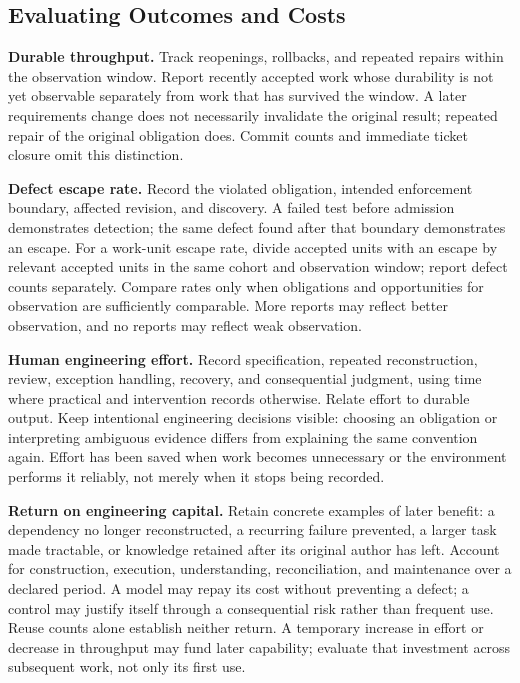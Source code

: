 \subsection{Evaluating Outcomes and Costs}\label{heading:evaluating-outcomes-and-costs}

\textbf{Durable throughput.} Track reopenings, rollbacks, and repeated repairs within the observation window. Report recently accepted work whose durability is not yet observable separately from work that has survived the window. A later requirements change does not necessarily invalidate the original result; repeated repair of the original obligation does. Commit counts and immediate ticket closure omit this distinction.

\textbf{Defect escape rate.} Record the violated obligation, intended enforcement boundary, affected revision, and discovery. A failed test before admission demonstrates detection; the same defect found after that boundary demonstrates an escape. For a work-unit escape rate, divide accepted units with an escape by relevant accepted units in the same cohort and observation window; report defect counts separately. Compare rates only when obligations and opportunities for observation are sufficiently comparable. More reports may reflect better observation, and no reports may reflect weak observation.

\textbf{Human engineering effort.} Record specification, repeated reconstruction, review, exception handling, recovery, and consequential judgment, using time where practical and intervention records otherwise. Relate effort to durable output. Keep intentional engineering decisions visible: choosing an obligation or interpreting ambiguous evidence differs from explaining the same convention again. Effort has been saved when work becomes unnecessary or the environment performs it reliably, not merely when it stops being recorded.

\textbf{Return on engineering capital.} Retain concrete examples of later benefit: a dependency no longer reconstructed, a recurring failure prevented, a larger task made tractable, or knowledge retained after its original author has left. Account for construction, execution, understanding, reconciliation, and maintenance over a declared period. A model may repay its cost without preventing a defect; a control may justify itself through a consequential risk rather than frequent use. Reuse counts alone establish neither return. A temporary increase in effort or decrease in throughput may fund later capability; evaluate that investment across subsequent work, not only its first use.

